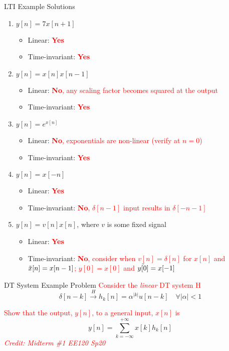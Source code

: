 \begin{frame}{LTI Example Solutions}
    \begin{enumerate}
        \item $y[n] = 7x[n+1]$
        \begin{itemize}
            \item Linear: \textcolor{red}{\textbf{Yes}}
            \item Time-invariant: \textcolor{red}{\textbf{Yes}}
        \end{itemize}
        \item $y[n] = x[n]x[n-1]$
        \begin{itemize}
            \item Linear: \textcolor{red}{\textbf{No}, any scaling factor becomes squared at the output}
            \item Time-invariant: \textcolor{red}{\textbf{Yes}}
        \end{itemize}
        \item $y[n] = e^{x[n]}$
        \begin{itemize}
            \item Linear: \textcolor{red}{\textbf{No}, exponentials are non-linear (verify at $n=0$)}
            \item Time-invariant: \textcolor{red}{\textbf{Yes}}
        \end{itemize}
        \item $y[n] = x[-n]$
        \begin{itemize}
            \item Linear: \textcolor{red}{\textbf{Yes}}
            \item Time-invariant: \textcolor{red}{\textbf{No}, $\delta[n-1]$ input results in $\delta[-n-1]$}
        \end{itemize}
        \item $y[n] = v[n]x[n]$, where $v$ is some fixed signal
        \begin{itemize}
            \item Linear: \textcolor{red}{\textbf{Yes}}
            \item Time-invariant: \textcolor{red}{\textbf{No}, consider when $v[n] = \delta[n]$ for $x[n]$ and $\Tilde{x}[n] = x[n-1]$; $y[0] = x[0]$ and $\Tilde{y[0]} = x[-1]$}
        \end{itemize}
    \end{enumerate}
\end{frame}

\begin{frame}{DT System Example Problem}
    \textcolor{red}{Consider the \textit{linear} DT system H}
    \[
    \delta[n-k] \overset{H}{\longrightarrow} h_k[n] = \alpha^{|k|}u[n-k] \quad \forall |\alpha| < 1
    \]

    \vspace{30px}

    \textcolor{red}{Show that the output, $y[n]$, to a general input, $x[n]$ is}
    \[
        y[n] = \sum_{k=-\infty}^{+\infty}x[k]h_k[n]
    \]
    {\footnotesize\textcolor{red}{\textit{Credit: Midterm \#1 EE120 Sp20}}}

\end{frame}

